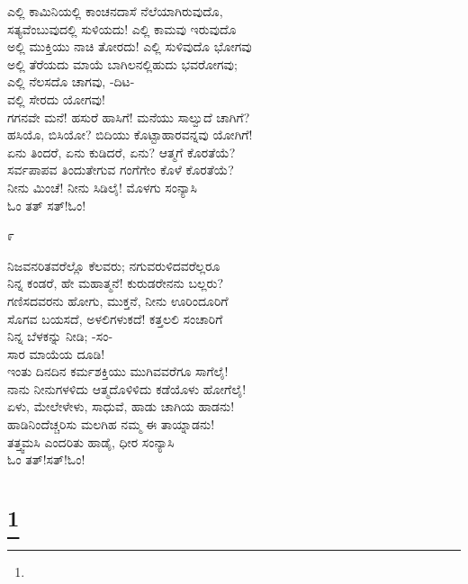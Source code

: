 \begin{myquote}
ಎಲ್ಲಿ ಕಾಮಿನಿಯಲ್ಲಿ ಕಾಂಚನದಾಸೆ ನೆಲೆಯಾಗಿರುವುದೊ,\\ಸತ್ಯವೆಂಬುವುದಲ್ಲಿ ಸುಳಿಯದು! ಎಲ್ಲಿ ಕಾಮವು ಇರುವುದೊ\\ಅಲ್ಲಿ ಮುಕ್ತಿಯು ನಾಚಿ ತೋರದು! ಎಲ್ಲಿ ಸುಳಿವುದೊ ಭೋಗವು\\ಅಲ್ಲಿ ತೆರೆಯದು ಮಾಯೆ ಬಾಗಿಲನಲ್ಲಿಹುದು ಭವರೋಗವು;\\ಎಲ್ಲಿ ನೆಲಸದೊ ಚಾಗವು, -ದಿಟ-\\ವಲ್ಲಿ ಸೇರದು ಯೋಗವು!\\ಗಗನವೇ ಮನೆ! ಹಸುರೆ ಹಾಸಿಗೆ! ಮನೆಯು ಸಾಲ್ವುದೆ ಚಾಗಿಗೆ?\\ಹಸಿಯೊ, ಬಿಸಿಯೋ? ಬಿದಿಯು ಕೊಟ್ಟಾಹಾರವನ್ನವು ಯೋಗಿಗೆ!\\ಏನು ತಿಂದರೆ, ಏನು ಕುಡಿದರೆ, ಏನು? ಆತ್ಮಗೆ ಕೊರತೆಯೆ?\\ಸರ್ವಪಾಪವ ತಿಂದುತೇಗುವ ಗಂಗೆಗೇಂ ಕೊಳೆ ಕೊರತೆಯೆ?\\ನೀನು ಮಿಂಚೆ! ನೀನು ಸಿಡಿಲೈ! ಮೊಳಗು ಸಂನ್ಯಾಸಿ\\ಓಂ ತತ್ ಸತ್!ಓಂ!
\end{myquote}

\begin{center}
೯
\end{center}

\begin{myquote}
ನಿಜವನರಿತವರೆಲ್ಲೊ ಕೆಲವರು; ನಗುವರುಳಿದವರೆಲ್ಲರೂ\\ನಿನ್ನ ಕಂಡರೆ, ಹೇ ಮಹಾತ್ಮನೆ! ಕುರುಡರೇನನು ಬಲ್ಲರು?\\ಗಣಿಸದವರನು ಹೋಗು, ಮುಕ್ತನೆ, ನೀನು ಊರಿಂದೂರಿಗೆ\\ಸೊಗವ ಬಯಸದೆ, ಅಳಲಿಗಳುಕದೆ! ಕತ್ತಲಲಿ ಸಂಚಾರಿಗೆ\\ನಿನ್ನ ಬೆಳಕನ್ನು ನೀಡಿ; -ಸಂ-\\ಸಾರ ಮಾಯೆಯ ದೂಡಿ!\\ಇಂತು ದಿನದಿನ ಕರ್ಮಶಕ್ತಿಯು ಮುಗಿವವರೆಗೂ ಸಾಗೆಲೈ!\\ನಾನು ನೀನುಗಳಳಿದು ಆತ್ಮದೊಳಿಳಿದು ಕಡೆಯೊಳು ಹೋಗೆಲೈ!\\ಏಳು, ಮೇಲೇಳೇಳು, ಸಾಧುವೆ, ಹಾಡು ಚಾಗಿಯ ಹಾಡನು!\\ಹಾಡಿನಿಂದೆಚ್ಚರಿಸು ಮಲಗಿಹ ನಮ್ಮ ಈ ತಾಯ್ನಾಡನು!\\ತತ್ತ್ವಮಸಿ ಎಂದರಿತು ಹಾಡೈ, ಧೀರ ಸಂನ್ಯಾಸಿ\\ಓಂ ತತ್!ಸತ್!ಓಂ!
\end{myquote}

\selecteng

\chapter[MANY HAPPY RETURNS]{\protect\footnote{}}

